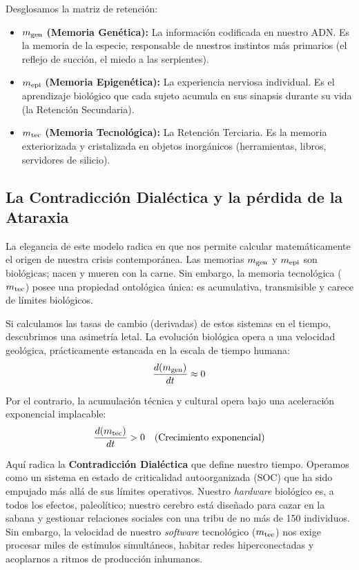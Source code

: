Desglosamos la matriz de retención:
\begin{itemize}
    \item $m_{\text{gen}}$ \textbf{(Memoria Genética):} La información codificada en nuestro ADN. Es la memoria de la especie, responsable de nuestros instintos más primarios (el reflejo de succión, el miedo a las serpientes).
    \item $m_{\text{epi}}$ \textbf{(Memoria Epigenética):} La experiencia nerviosa individual. Es el aprendizaje biológico que cada sujeto acumula en sus sinapsis durante su vida (la Retención Secundaria).
    \item $m_{\text{tec}}$ \textbf{(Memoria Tecnológica):} La Retención Terciaria. Es la memoria exteriorizada y cristalizada en objetos inorgánicos (herramientas, libros, servidores de silicio).
\end{itemize}

\subsection{La Contradicción Dialéctica y la pérdida de la Ataraxia}

La elegancia de este modelo radica en que nos permite calcular matemáticamente el origen de nuestra crisis contemporánea. Las memorias $m_{\text{gen}}$ y $m_{\text{epi}}$ son biológicas; nacen y mueren con la carne. Sin embargo, la memoria tecnológica ($m_{\text{tec}}$) posee una propiedad ontológica única: es acumulativa, transmisible y carece de límites biológicos. 

Si calculamos las tasas de cambio (derivadas) de estos sistemas en el tiempo, descubrimos una asimetría letal. La evolución biológica opera a una velocidad geológica, prácticamente estancada en la escala de tiempo humana:
\begin{equation}
    \frac{d(m_{\text{gen}})}{dt} \approx 0
\end{equation}

Por el contrario, la acumulación técnica y cultural opera bajo una aceleración exponencial implacable:
\begin{equation}
    \frac{d(m_{\text{tec}})}{dt} > 0 \quad (\text{Crecimiento exponencial})
\end{equation}

Aquí radica la \textbf{Contradicción Dialéctica} que define nuestro tiempo. Operamos como un sistema en estado de criticalidad autoorganizada (SOC) que ha sido empujado más allá de sus límites operativos. Nuestro \textit{hardware} biológico es, a todos los efectos, paleolítico; nuestro cerebro está diseñado para cazar en la sabana y gestionar relaciones sociales con una tribu de no más de 150 individuos. Sin embargo, la velocidad de nuestro \textit{software} tecnológico ($m_{\text{tec}}$) nos exige procesar miles de estímulos simultáneos, habitar redes hiperconectadas y acoplarnos a ritmos de producción inhumanos. 

